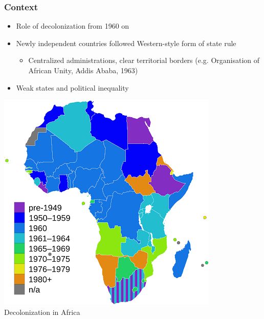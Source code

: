 \documentclass[aspectratio=43]{beamer}
\begin{document}
\begin{frame}
\frametitle{Context}
\centering

\begin{minipage}{0.58\textwidth}\centering
\begin{itemize}
  \item Role of decolonization from 1960 on
  \item Newly independent countries followed Western-style form of state rule
  \begin{itemize}
    \item Centralized administrations, clear territorial borders (e.g. Organisation of African Unity, Addis Ababa, 1963)
  \end{itemize}
  \item<2-> Weak states and political inequality %
\end{itemize}
\end{minipage}\hfill
\begin{minipage}{0.4\textwidth}\centering
\includegraphics[width = \textwidth]{img/africa_decolonization}\\
Decolonization in Africa
\end{minipage}

\end{frame}
\end{document}
